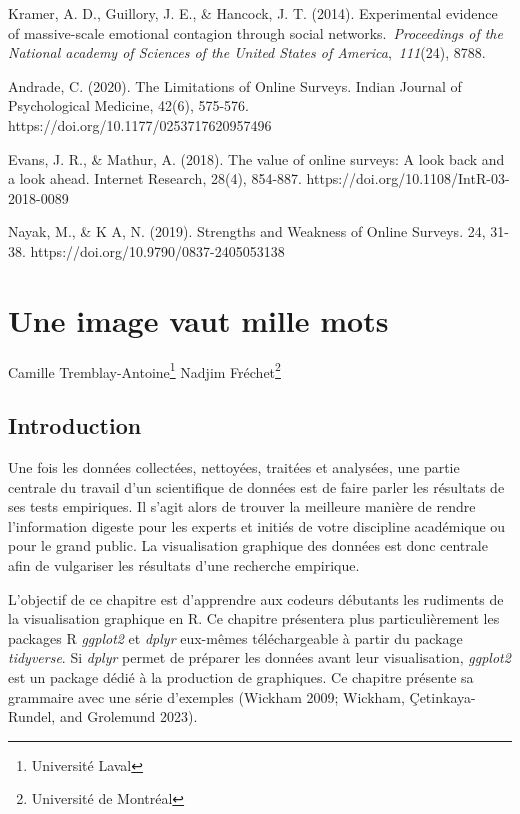 \documentclass[
  letterpaper,
]{scrbook}
\begin{document}
Kramer, A. D., Guillory, J. E., \& Hancock, J. T. (2014). Experimental
evidence of massive-scale emotional contagion through social
networks.~\emph{Proceedings of the National academy of Sciences of the
United States of America},~\emph{111}(24), 8788.

Andrade, C. (2020). The Limitations of Online Surveys. Indian Journal of
Psychological Medicine, 42(6), 575-576.
https://doi.org/10.1177/0253717620957496

\hfill\break
Evans, J. R., \& Mathur, A. (2018). The value of online surveys: A look
back and a look ahead. Internet Research, 28(4), 854-887.
https://doi.org/10.1108/IntR-03-2018-0089

\hfill\break
Nayak, M., \& K A, N. (2019). Strengths and Weakness of Online Surveys.
24, 31-38. https://doi.org/10.9790/0837-2405053138


\hypertarget{une-image-vaut-mille-mots}{%
\chapter{Une image vaut mille mots}\label{une-image-vaut-mille-mots}}

Camille Tremblay-Antoine\footnote{Université Laval} Nadjim
Fréchet\footnote{Université de Montréal}

\hypertarget{introduction-2}{%
\section{Introduction}\label{introduction-2}}

Une fois les données collectées, nettoyées, traitées et analysées, une
partie centrale du travail d'un scientifique de données est de faire
parler les résultats de ses tests empiriques. Il s'agit alors de trouver
la meilleure manière de rendre l'information digeste pour les experts et
initiés de votre discipline académique ou pour le grand public. La
visualisation graphique des données est donc centrale afin de vulgariser
les résultats d'une recherche empirique.

L'objectif de ce chapitre est d'apprendre aux codeurs débutants les
rudiments de la visualisation graphique en R. Ce chapitre présentera
plus particulièrement les packages R \emph{ggplot2} et \emph{dplyr}
eux-mêmes téléchargeable à partir du package \emph{tidyverse}. Si
\emph{dplyr} permet de préparer les données avant leur visualisation,
\emph{ggplot2} est un package dédié à la production de graphiques. Ce
chapitre présente sa grammaire avec une série d'exemples (Wickham 2009;
Wickham, Çetinkaya-Rundel, and Grolemund 2023).
\end{document}
